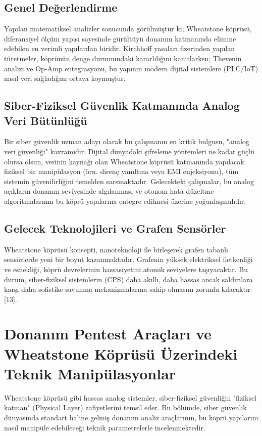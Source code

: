 \documentclass[12pt,a4paper]{article}
\begin{document}
\subsection{Genel Değerlendirme}
Yapılan matematiksel analizler sonucunda görülmüştür ki; Wheatstone köprüsü, diferansiyel ölçüm yapısı sayesinde gürültüyü donanım katmanında elimine edebilen en verimli yapılardan biridir. Kirchhoff yasaları üzerinden yapılan türetmeler, köprünün denge durumundaki kararlılığını kanıtlarken; Thevenin analizi ve Op-Amp entegrasyonu, bu yapının modern dijital sistemlere (PLC/IoT) nasıl veri sağladığını ortaya koymuştur.

\subsection{Siber-Fiziksel Güvenlik Katmanında Analog Veri Bütünlüğü}
Bir siber güvenlik uzman adayı olarak bu çalışmanın en kritik bulgusu, "analog veri güvenliği" kavramıdır. Dijital dünyadaki şifreleme yöntemleri ne kadar güçlü olursa olsun, verinin kaynağı olan Wheatstone köprüsü katmanında yapılacak fiziksel bir manipülasyon (örn. direnç yanıltma veya EMI enjeksiyonu), tüm sistemin güvenilirliğini temelden sarsmaktadır. Gelecekteki çalışmalar, bu analog açıkların donanım seviyesinde algılanması ve otonom hata düzeltme algoritmalarının bu köprü yapılarına entegre edilmesi üzerine yoğunlaşmalıdır.

\subsection{Gelecek Teknolojileri ve Grafen Sensörler}
Wheatstone köprüsü konsepti, nanoteknoloji ile birleşerek grafen tabanlı sensörlerde yeni bir boyut kazanmaktadır. Grafenin yüksek elektriksel iletkenliği ve esnekliği, köprü devrelerinin hassasiyetini atomik seviyelere taşıyacaktır. Bu durum, siber-fiziksel sistemlerin (CPS) daha akıllı, daha hassas ancak saldırılara karşı daha sofistike savunma mekanizmalarına sahip olmasını zorunlu kılacaktır [13].

\section{Donanım Pentest Araçları ve Wheatstone Köprüsü Üzerindeki Teknik Manipülasyonlar}
Wheatstone köprüsü gibi hassas analog sistemler, siber-fiziksel güvenliğin "fiziksel katman" (Physical Layer) zafiyetlerini temsil eder. Bu bölümde, siber güvenlik dünyasında standart haline gelmiş donanım analiz araçlarının, bu köprü yapılarını nasıl manipüle edebileceği teknik parametrelerle incelenmektedir.
\end{document}
